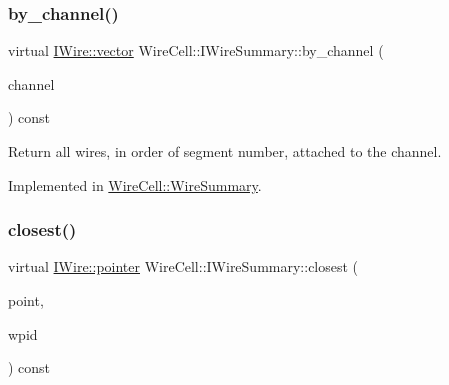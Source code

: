 \mbox{\label{class_wire_cell_1_1_i_wire_summary_a145ad4b5e1099d7914754459cc3a5a41}} 
\subsubsection{\texorpdfstring{by\+\_\+channel()}{by\_channel()}}
{\footnotesize\ttfamily virtual \hyperlink{class_wire_cell_1_1_i_data_ae1a9f863380499bb43f39fabb6276660}{I\+Wire\+::vector} Wire\+Cell\+::\+I\+Wire\+Summary\+::by\+\_\+channel (\begin{DoxyParamCaption}\item[{int}]{channel }\end{DoxyParamCaption}) const\hspace{0.3cm}{\ttfamily [pure virtual]}}



Return all wires, in order of segment number, attached to the channel. 



Implemented in \hyperlink{class_wire_cell_1_1_wire_summary_ae627ae15980a5d2ea5dd0e3f8eb47fe8}{Wire\+Cell\+::\+Wire\+Summary}.

\mbox{\label{class_wire_cell_1_1_i_wire_summary_aa3c27c8c001bfacb7b1eb55dc586fb9f}} 
\subsubsection{\texorpdfstring{closest()}{closest()}}
{\footnotesize\ttfamily virtual \hyperlink{class_wire_cell_1_1_i_data_aff870b3ae8333cf9265941eef62498bc}{I\+Wire\+::pointer} Wire\+Cell\+::\+I\+Wire\+Summary\+::closest (\begin{DoxyParamCaption}\item[{const \hyperlink{namespace_wire_cell_ab2b2565fa6432efbb4513c14c988cda9}{Point} \&}]{point,  }\item[{\hyperlink{class_wire_cell_1_1_wire_plane_id}{Wire\+Plane\+Id}}]{wpid }\end{DoxyParamCaption}) const\hspace{0.3cm}{\ttfamily [pure virtual]}}

